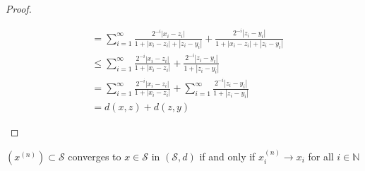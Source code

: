 \documentclass[a4paper]{article}
\newcommand{\N}{\mathbb{N}} %
\begin{document}
\begin{proof}
\begin{enumerate}
\begin{align*}
            &= \sum_{i = 1}^{\infty} \frac{2^{-i} |x_i - z_i|}{1+ |x_i - z_i| + |z_i - y_i|}  + \frac{2^{-i} |z_i - y_i|}{1+ |x_i - z_i| + |z_i - y_i|}\\
            & \leq \sum_{i = 1}^{\infty} \frac{2^{-i} |x_i - z_i|}{1+ |x_i - z_i|}  + \frac{2^{-i} |z_i - y_i|}{1 + |z_i - y_i|}\\
            & = \sum_{i = 1}^{\infty} \frac{2^{-i} |x_i - z_i|}{1+ |x_i - z_i|}  + \sum_{i = 1}^{\infty} \frac{2^{-i} |z_i - y_i|}{1 + |z_i - y_i|}\\
            & = d(x,z) + d(z,y)
        \end{align*}

\end{enumerate}
\end{proof}
\begin{issue}{}{}
    $(x^{(n)}) \subset \mathcal{S}$ converges to $x \in \mathcal{S}$ in $(\mathcal{S},d)$ if and only if $x_i^{(n)} \to x_i$ for all $i \in \N$
\end{issue}
\end{document}
